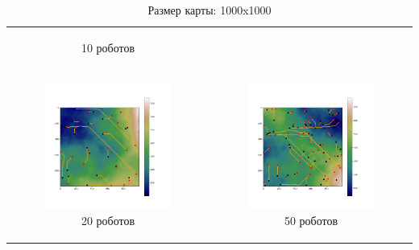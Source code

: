 \documentclass{article}
\numberwithin{equation}{section}
\begin{document}
\begin{table}[H]
\begin{tabular}{c c}
\begin{subfigure}{0.5\linewidth}
			\caption*{10 роботов}
			\end{subfigure}
			\\
            \begin{subfigure}{0.5\linewidth}
				\includegraphics[width = 1.0\columnwidth]{data/mean_paths/1000x1000/20.png}
			\caption*{20 роботов}
			\end{subfigure}
			&
			\begin{subfigure}{0.5\linewidth}
				\includegraphics[width = 1.0\columnwidth]{data/mean_paths/1000x1000/50.png}
			\caption*{50 роботов}
			\end{subfigure}
        \end{tabular}
        \caption*{Размер карты: 1000x1000}
	\end{table}
\end{document}

